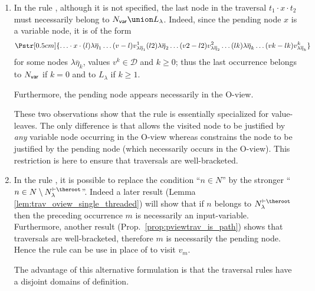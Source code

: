 \begin{remark}
\begin{enumerate}
    \item In the rule , although it is not specified, the last node in the traversal $t_1 \cdot x \cdot t_2$ must necessarily belong to $N_{\sf var} \union L_\lambda$. Indeed, since the pending node $x$ is a variable node, it is of the form
$$\Pstr[0.5cm]{\ldots \cdot x \cdot  (l){\lambda \overline{\eta}_1}\ldots (v-l){v^1_{\lambda \overline{\eta}_1}}
(l2){\lambda \overline{\eta}_2}\ldots (v2-l2){v^2_{\lambda \overline{\eta}_2}}
\ldots (lk){\lambda \overline{\eta}_k}\ldots (vk-lk){v^k_{\lambda \overline{\eta}_k}}
}$$ for some nodes $\lambda \overline{\eta}_k$, values $v^k \in \mathcal{D}$ and $k\geq 0$; thus the last occurrence belongs to $N_{\sf var}$ if $k=0$ and to $L_\lambda$ if $k\geq1$.

    Furthermore, the pending node appears necessarily in the O-view.

    These two observations show that the rule  is essentially  specialized for value-leaves. The only difference is that 
    allows the visited node to be justified by \emph{any} variable node occurring in the O-view whereas  constrains the node
    to be justified by the pending node (which necessarily occurs in the O-view). This restriction is here to ensure that traversals are well-bracketed.

\item In the rule
, it is possible to replace the condition ``$n\in N$'' by the stronger ``$n\in N\setminus N_{\sf \lambda}^{\vdash\theroot}$''. Indeed a later result (Lemma \ref{lem:trav_oview_single_threaded}) will show that if $n$ belongs to $N_{\lambda}^{\vdash\theroot}$ then the preceding occurrence $m$ is necessarily an input-variable.
Furthermore, another result (Prop.\ \ref{prop:pviewtrav_is_path}) shows that traversals are well-bracketed, therefore $m$ is necessarily the pending node. Hence the rule  can be use in place of
 to visit $v_m$.


The advantage of this alternative formulation is that the traversal rules have a disjoint domains of definition.
\end{enumerate}
\end{remark}
\bigskip


